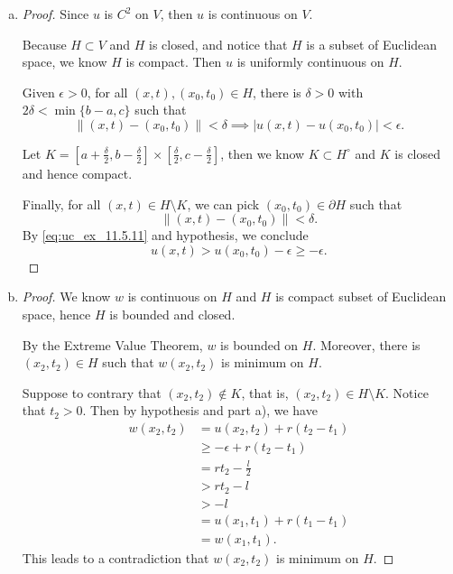 \begin{Exercise}
\begin{enumerate}[a)]
\item
\begin{proof}
Since $u$ is $C^2$ on $V$, then $u$ is continuous on $V$.

Because $H\subset V$ and $H$ is closed, and notice that $H$ is a subset of Euclidean space, we know $H$ is compact. Then $u$ is uniformly continuous on $H$.

Given $\epsilon>0$, for all $(x,t),(x_0,t_0)\in H$, there is $\delta>0$ with $2\delta<\min\{b-a,c\}$ such that
\begin{equation}
\|(x,t)-(x_0,t_0)\|<\delta \implies |u(x,t)-u(x_0,t_0)|<\epsilon. \label{eq:uc_ex_11.5.11}
\end{equation}

Let $K=\left[a+\frac{\delta}{2},b-\frac{\delta}{2}\right]\times\left[\frac{\delta}{2},c-\frac{\delta}{2}\right]$, then we know $K\subset H^{\circ}$ and $K$ is closed and hence compact.

Finally, for all $(x,t)\in H\setminus K$, we can pick $(x_0,t_0)\in \partial H$ such that 
$$
\|(x,t)-(x_0,t_0)\|<\delta.
$$
By \eqref{eq:uc_ex_11.5.11} and hypothesis, we conclude
$$
u(x,t) > u(x_0,t_0)-\epsilon \geq -\epsilon.
$$
\end{proof}

\item
\begin{proof}
We know $w$ is continuous on $H$ and $H$ is compact subset of Euclidean space, hence $H$ is bounded and closed.

By the Extreme Value Theorem, $w$ is bounded on $H$. Moreover, there is $(x_2,t_2)\in H$ such that $w(x_2,t_2)$ is minimum on $H$.

Suppose to contrary that $(x_2,t_2)\notin K$, that is, $(x_2,t_2)\in H \setminus K$. Notice that $t_2>0$. Then by hypothesis and part a), we have
\begin{align*}
w(x_2,t_2)
&= u(x_2,t_2) + r(t_2-t_1) \\
&\geq -\epsilon+r(t_2-t_1) \\
&=r t_2-\frac{l}{2} \\
&> r t_2 - l \\
&> -l \\
&= u(x_1,t_1) + r(t_1-t_1) \\
&= w(x_1,t_1).
\end{align*}
This leads to a contradiction that $w(x_2,t_2)$ is minimum on $H$.


\end{proof}
\end{enumerate}
\end{Exercise}
